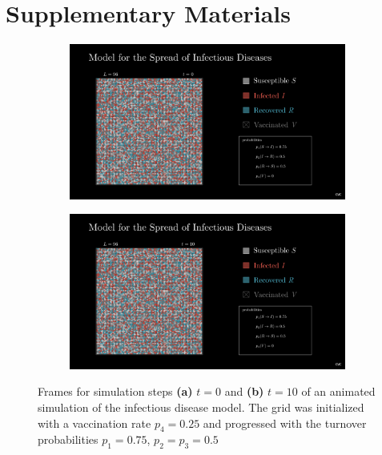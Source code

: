 \section{Supplementary Materials}

\begin{figure}[ht]
    \centering
    \begin{subfigure}{0.49\textwidth}
        \centering
        \includegraphics[width=1\textwidth]{images/soi_main_scene_75_50_50_25_init.png}
    \end{subfigure}
    \begin{subfigure}{0.49\textwidth}
        \centering
        \includegraphics[width=1\textwidth]{images/soi_main_scene_75_50_50_25_t10.png}
    \end{subfigure}
    \caption{Frames for simulation steps \textbf{(a)} $t=0$ and \textbf{(b)} $t=10$ of an animated simulation of the infectious disease model. The grid was initialized with a vaccination rate $p_4=0.25$
    and progressed with the turnover probabilities $p_1=0.75$, $p_2=p_3=0.5$}\label{fig:Animation_Inf_t}
\end{figure}